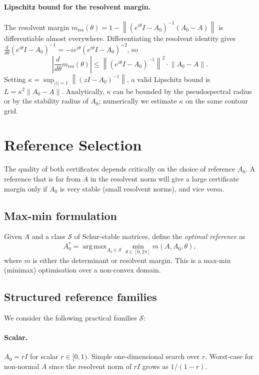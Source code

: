 \documentclass{article}
\theoremstyle{definition}
\DeclareMathOperator*{\argmax}{arg\,max}
\newcommand{\norm}[1]{\left\|#1\right\|}
\begin{document}
\paragraph{Lipschitz bound for the resolvent margin.}
The resolvent margin $m_{\mathrm{res}}(\theta) = 1 - \norm{(e^{i\theta}I -
A_0)^{-1}(A_0 - A)}$ is differentiable almost everywhere.  Differentiating
the resolvent identity gives
$\frac{d}{d\theta}(e^{i\theta}I - A_0)^{-1} = -ie^{i\theta}
(e^{i\theta}I - A_0)^{-2}$, so
\[
  \left|\frac{d}{d\theta} m_{\mathrm{res}}(\theta)\right|
  \leq \norm{(e^{i\theta}I - A_0)^{-1}}^2 \cdot \norm{A_0 - A}.
\]
Setting $\kappa = \sup_{|z|=1}\norm{(zI-A_0)^{-1}}$, a valid Lipschitz bound is
$L = \kappa^2 \norm{A_0 - A}$.  Analytically, $\kappa$ can be bounded by the
pseudospectral radius or by the stability radius of $A_0$; numerically we
estimate $\kappa$ on the same contour grid.

\section{Reference Selection}
\label{sec:refsel}

The quality of both certificates depends critically on the choice of reference
$A_0$.  A reference that is far from $A$ in the resolvent norm will give a
large certificate margin only if $A_0$ is very stable (small resolvent norms),
and vice versa.

\subsection{Max-min formulation}

Given $A$ and a class $\mathcal{S}$ of Schur-stable matrices, define the
\emph{optimal reference} as
\[
  A_0^* = \argmax_{A_0 \in \mathcal{S}} \min_{\theta \in [0, 2\pi]}
  m(A, A_0, \theta),
\]
where $m$ is either the determinant or resolvent margin.  This is a max-min
(minimax) optimisation over a non-convex domain.

\subsection{Structured reference families}

We consider the following practical families $\mathcal{S}$:

\paragraph{Scalar.}
$A_0 = rI$ for scalar $r \in [0, 1)$.  Simple one-dimensional search over
$r$.  Worst-case for non-normal $A$ since the resolvent norm of $rI$ grows
as $1/(1-r)$.
\end{document}

